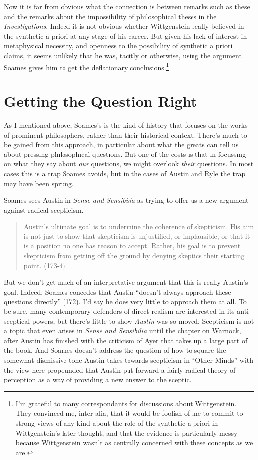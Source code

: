 \noindent Now it is far from obvious what the connection is between remarks such as these and the remarks about the impossibility of philosophical theses in the \textit{Investigations}. Indeed it is not obvious whether Wittgenstein really believed in the synthetic a priori at any stage of his career. But given his lack of interest in metaphysical necessity, and openness to the possibility of synthetic a priori claims, it seems unlikely that he was, tacitly or otherwise, using the argument Soames gives him to get the deflationary conclusions.\footnote{I'm grateful to many correspondants for discussions about Wittgenstein. They convinced me, inter alia, that it would be foolish of me to commit to strong views of any kind about the role of the synthetic a priori in Wittgenstein's later thought, and that the evidence is particularly messy because Wittgenstein wasn't as centrally concerned with these concepts as we are.} 

\section{Getting the Question Right}

As I mentioned above, Soames's is the kind of history that focuses on the works of prominent philosophers, rather than their historical context. There's much to be gained from this approach, in particular about what the greats can tell us about pressing philosophical questions. But one of the costs is that in focussing on what they say about \textit{our} questions, we might overlook \textit{their} questions. In most cases this is a trap Soames avoids, but in the cases of Austin and Ryle the trap may have been sprung.

Soames sees Austin in \textit{Sense and Sensibilia} as trying to offer us a new argument against radical scepticism.

\begin{quote}
Austin's ultimate goal is to undermine the coherence of skepticism. His aim is not just to show that skepticism is unjustified, or implausible, or that it is a position no one has reason to accept. Rather, his goal is to prevent skepticism from getting off the ground by denying skeptics their starting point. (173-4)
\end{quote}

\noindent But we don't get much of an interpretative argument that this is really Austin's goal. Indeed, Soames concedes that Austin ``doesn't always approach these questions directly'' (172). I'd say he does very little to approach them at all. To be sure, many contemporary defenders of direct realism are interested in its anti-sceptical powers, but there's little to show \textit{Austin} was so moved. Scepticism is not a topic that even arises in \textit{Sense and Sensibilia} until the chapter on Warnock, after Austin has finished with the criticism of Ayer that takes up a large part of the book. And Soames doesn't address the question of how to square the somewhat dismissive tone Austin takes towards scepticism in ``Other Minds'' with the view here propounded that Austin put forward a fairly radical theory of perception as a way of providing a new answer to the sceptic.

